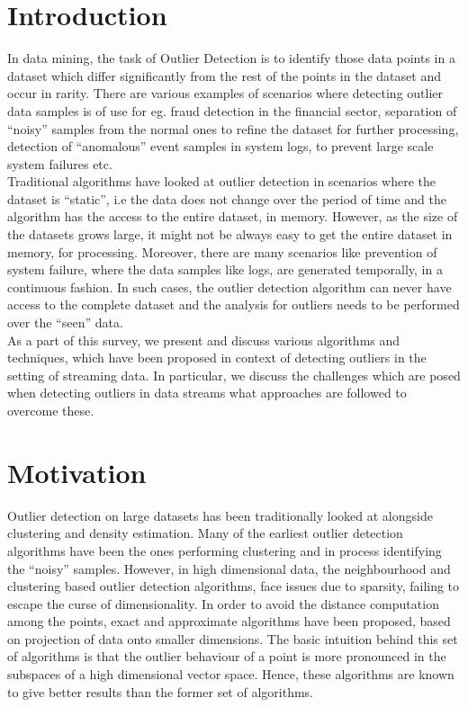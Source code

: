 \section{Introduction}

In data mining, the task of Outlier Detection is to identify those data points in a dataset which differ significantly from the rest of the points in the dataset and occur in rarity. There are various examples of scenarios where detecting outlier data samples is of use for eg. fraud detection in the financial sector, separation of ``noisy'' samples from the normal ones to refine the dataset for further processing, detection of ``anomalous'' event samples in system logs, to prevent large scale system failures etc. \\

Traditional algorithms have looked at outlier detection in scenarios where the dataset is ``static'', i.e the data does not change over the period of time and the algorithm has the access to the entire dataset, in memory. However, as the size of the datasets grows large, it might not be always easy to get the entire dataset in memory, for processing. Moreover, there are many scenarios like prevention of system failure, where the data samples like logs, are generated temporally, in a continuous fashion. In such cases, the outlier detection algorithm can never have access to the complete dataset and the analysis for outliers needs to be performed over the ``seen'' data. \\

As a part of this survey, we present and discuss various algorithms and techniques, which have been proposed in context of detecting outliers in the setting of streaming data. In particular, we discuss the challenges which are posed when detecting outliers in data streams what approaches are followed to overcome these.


\section{Motivation}

Outlier detection on large datasets has been traditionally looked at alongside clustering and density estimation. Many of the earliest outlier detection algorithms have been the ones performing clustering and in process identifying the ``noisy'' samples. However, in high dimensional data\cite{aggarwal2001outlier}, the neighbourhood and clustering based outlier detection algorithms, face issues due to sparsity, failing to escape the curse of dimensionality. In order to avoid the distance computation among the points, exact and approximate algorithms have been proposed, based on projection of data onto smaller dimensions. The basic intuition behind this set of algorithms is that the outlier behaviour of a point is more pronounced in the subspaces of a high dimensional vector space. Hence, these algorithms are known to give better results than the former set of algorithms. \\

